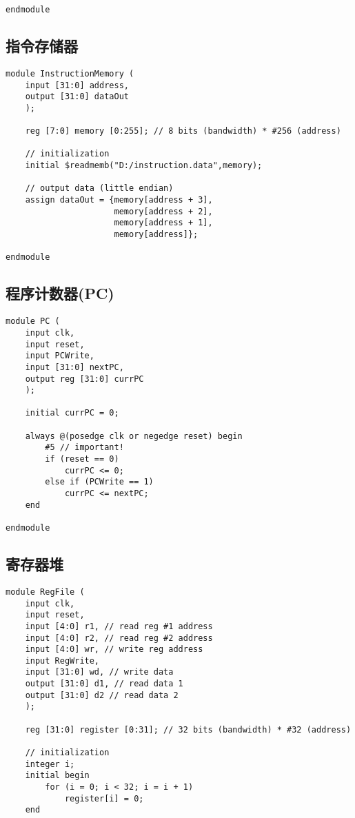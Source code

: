 \begin{multicols}{2}
\begin{lstlisting}
endmodule
\end{lstlisting}

\subsection{指令存储器}
\begin{lstlisting}
module InstructionMemory (
	input [31:0] address,
	output [31:0] dataOut
	);
	
	reg [7:0] memory [0:255]; // 8 bits (bandwidth) * #256 (address)

	// initialization
	initial $readmemb("D:/instruction.data",memory);

	// output data (little endian)
	assign dataOut = {memory[address + 3],
					  memory[address + 2],
					  memory[address + 1],
					  memory[address]};

endmodule
\end{lstlisting}

\subsection{程序计数器(PC)}
\begin{lstlisting}
module PC (
    input clk,
    input reset,
    input PCWrite,
    input [31:0] nextPC,
    output reg [31:0] currPC
    );

    initial currPC = 0;

    always @(posedge clk or negedge reset) begin
        #5 // important!
        if (reset == 0)
            currPC <= 0;
        else if (PCWrite == 1)
            currPC <= nextPC;
    end

endmodule
\end{lstlisting}

\subsection{寄存器堆}
\begin{lstlisting}
module RegFile (
    input clk,
    input reset,
    input [4:0] r1, // read reg #1 address
    input [4:0] r2, // read reg #2 address
    input [4:0] wr, // write reg address
    input RegWrite,
    input [31:0] wd, // write data
    output [31:0] d1, // read data 1
    output [31:0] d2 // read data 2
    );
    
    reg [31:0] register [0:31]; // 32 bits (bandwidth) * #32 (address)
    
    // initialization
    integer i;
    initial begin
        for (i = 0; i < 32; i = i + 1)
            register[i] = 0;
    end


\end{lstlisting}
\end{multicols}
